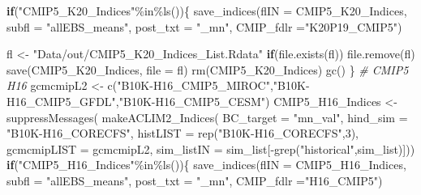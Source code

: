 \documentclass[
]{article}
\newenvironment{Shaded}{\begin{snugshade}}{\end{snugshade}}
\newcommand{\AttributeTok}[1]{\textcolor[rgb]{0.77,0.63,0.00}{#1}}
\newcommand{\CommentTok}[1]{\textcolor[rgb]{0.56,0.35,0.01}{\textit{#1}}}
\newcommand{\ControlFlowTok}[1]{\textcolor[rgb]{0.13,0.29,0.53}{\textbf{#1}}}
\newcommand{\DecValTok}[1]{\textcolor[rgb]{0.00,0.00,0.81}{#1}}
\newcommand{\FunctionTok}[1]{\textcolor[rgb]{0.00,0.00,0.00}{#1}}
\newcommand{\NormalTok}[1]{#1}
\newcommand{\OtherTok}[1]{\textcolor[rgb]{0.56,0.35,0.01}{#1}}
\newcommand{\SpecialCharTok}[1]{\textcolor[rgb]{0.00,0.00,0.00}{#1}}
\newcommand{\StringTok}[1]{\textcolor[rgb]{0.31,0.60,0.02}{#1}}
\begin{document}
\begin{Shaded}
\begin{Highlighting}[]
    \ControlFlowTok{if}\NormalTok{(}\StringTok{"CMIP5\_K20\_Indices"}\SpecialCharTok{\%in\%}\FunctionTok{ls}\NormalTok{())\{}
        \FunctionTok{save\_indices}\NormalTok{(}\AttributeTok{flIN =}\NormalTok{ CMIP5\_K20\_Indices, }
                     \AttributeTok{subfl =} \StringTok{"allEBS\_means"}\NormalTok{,}
                     \AttributeTok{post\_txt =} \StringTok{"\_mn"}\NormalTok{,}
                     \AttributeTok{CMIP\_fdlr =}\StringTok{"K20P19\_CMIP5"}\NormalTok{)}
        
\NormalTok{        fl }\OtherTok{\textless{}{-}} \StringTok{"Data/out/CMIP5\_K20\_Indices\_List.Rdata"}
        \ControlFlowTok{if}\NormalTok{(}\FunctionTok{file.exists}\NormalTok{(fl)) }\FunctionTok{file.remove}\NormalTok{(fl)}
        \FunctionTok{save}\NormalTok{(CMIP5\_K20\_Indices, }\AttributeTok{file =}\NormalTok{ fl)}
        \FunctionTok{rm}\NormalTok{(CMIP5\_K20\_Indices)}
        \FunctionTok{gc}\NormalTok{()}
\NormalTok{    \}}
    \CommentTok{\# CMIP5 H16}
\NormalTok{    gcmcmipL2 }\OtherTok{\textless{}{-}} \FunctionTok{c}\NormalTok{(}\StringTok{"B10K{-}H16\_CMIP5\_MIROC"}\NormalTok{,}\StringTok{"B10K{-}H16\_CMIP5\_GFDL"}\NormalTok{,}\StringTok{"B10K{-}H16\_CMIP5\_CESM"}\NormalTok{) }
\NormalTok{    CMIP5\_H16\_Indices }\OtherTok{\textless{}{-}} \FunctionTok{suppressMessages}\NormalTok{(}
                        \FunctionTok{makeACLIM2\_Indices}\NormalTok{(}
                        \AttributeTok{BC\_target =} \StringTok{"mn\_val"}\NormalTok{,}
                        \AttributeTok{hind\_sim  =}  \StringTok{"B10K{-}H16\_CORECFS"}\NormalTok{,}
                        \AttributeTok{histLIST  =} \FunctionTok{rep}\NormalTok{(}\StringTok{"B10K{-}H16\_CORECFS"}\NormalTok{,}\DecValTok{3}\NormalTok{),}
                        \AttributeTok{gcmcmipLIST =}\NormalTok{ gcmcmipL2,}
                        \AttributeTok{sim\_listIN =}\NormalTok{ sim\_list[}\SpecialCharTok{{-}}\FunctionTok{grep}\NormalTok{(}\StringTok{"historical"}\NormalTok{,sim\_list)]))}
    \ControlFlowTok{if}\NormalTok{(}\StringTok{"CMIP5\_H16\_Indices"}\SpecialCharTok{\%in\%}\FunctionTok{ls}\NormalTok{())\{}
      \FunctionTok{save\_indices}\NormalTok{(}\AttributeTok{flIN =}\NormalTok{ CMIP5\_H16\_Indices, }
                   \AttributeTok{subfl =} \StringTok{"allEBS\_means"}\NormalTok{,}
                   \AttributeTok{post\_txt =} \StringTok{"\_mn"}\NormalTok{,}
                   \AttributeTok{CMIP\_fdlr =}\StringTok{"H16\_CMIP5"}\NormalTok{)}
     

\end{Highlighting}
\end{Shaded}
\end{document}
